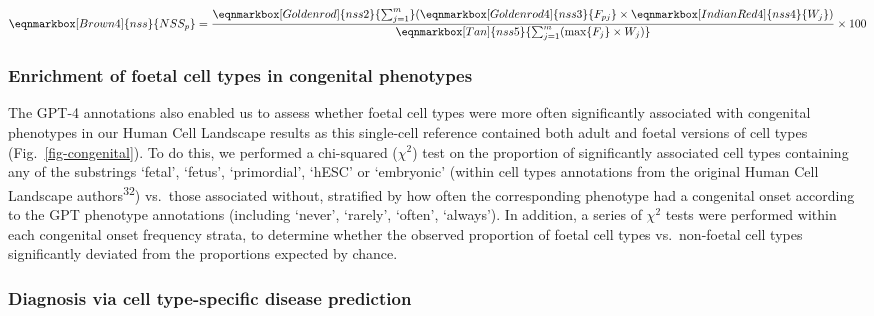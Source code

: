 \documentclass[
sn-nature
]{sn-jnl}
\begin{document}
\begin{equation*}
  \eqnmarkbox[Brown4]{nss}{NSS_p}
  =
  \frac{ 
    \eqnmarkbox[Goldenrod]{nss2}{\sum_{j=1}^{m}} 
    (
      \eqnmarkbox[Goldenrod4]{nss3}{F_{pj}}
      \times 
      \eqnmarkbox[IndianRed4]{nss4}{W_j}
    )
    }{
    \eqnmarkbox[Tan]{nss5}{\sum_{j=1}^{m}(\max\{F_j\} \times W_j)} 
  } \times 100
\end{equation*}

\hfill\break

\subsubsection{Enrichment of foetal cell types in congenital
phenotypes}\label{enrichment-of-foetal-cell-types-in-congenital-phenotypes-1}

The GPT-4 annotations also enabled us to assess whether foetal cell
types were more often significantly associated with congenital
phenotypes in our Human Cell Landscape results as this single-cell
reference contained both adult and foetal versions of cell types
(Fig.~\ref{fig-congenital}). To do this, we performed a chi-squared
(\(\chi^2\)) test on the proportion of significantly associated cell
types containing any of the substrings `fetal', `fetus', `primordial',
`hESC' or `embryonic' (within cell types annotations from the original
Human Cell Landscape authors\textsuperscript{32}) vs.~those associated
without, stratified by how often the corresponding phenotype had a
congenital onset according to the GPT phenotype annotations (including
`never', `rarely', `often', `always'). In addition, a series of
\(\chi^2\) tests were performed within each congenital onset frequency
strata, to determine whether the observed proportion of foetal cell
types vs.~non-foetal cell types significantly deviated from the
proportions expected by chance.

\subsubsection{Diagnosis via cell type-specific disease
prediction}\label{diagnosis-via-cell-type-specific-disease-prediction-1}
\end{document}
